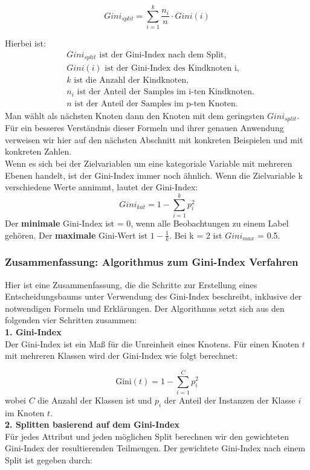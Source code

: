 \documentclass[12pt]{article}
\begin{document}
\[
Gini_{split} = \sum_{i=1}^{k} \frac{n_i}{n} \cdot Gini(i)
\]

Hierbei ist:
\begin{align*}
& Gini_{split} \text{{ ist der Gini-Index nach dem Split}}, \\
& Gini(i) \text{{ ist der Gini-Index des Kindknoten i}}, \\
& k \text{{ ist die Anzahl der Kindknoten}}, \\
& n_i \text{{ ist der Anteil der Samples im i-ten Kindknoten.}}\\
& n \text{{ ist der Anteil der Samples im p-ten Knoten.}}
\end{align*}
%
Man wählt als nächsten Knoten dann den Knoten mit dem geringsten $Gini_{split}$.
Für ein besseres Verständnis dieser Formeln und ihrer genauen Anwendung verweisen wir hier auf den nächsten Abschnitt mit konkreten Beispielen und mit konkreten Zahlen.\\
Wenn es sich bei der Zielvariablen um eine kategoriale Variable mit mehreren Ebenen handelt, ist der Gini-Index immer noch ähnlich. Wenn die Zielvariable k verschiedene Werte annimmt, lautet der Gini-Index:
\[
Gini_{kat} = 1 - \sum_{i=1}^{k} p_i^2
\]
%
Der \textbf{minimale} Gini-Index ist = 0, wenn alle Beobachtungen zu einem Label gehören. Der \textbf{maximale} Gini-Wert ist $1 - \frac{1}{k}$. Bei k = 2 ist $Gini_{max}$ = 0.5.\\
%
\subsubsection{Zusammenfassung: Algorithmus zum Gini-Index Verfahren}
%
Hier ist eine Zusammenfassung, die die Schritte zur Erstellung eines Entscheidungsbaums unter Verwendung des Gini-Index beschreibt, inklusive der notwendigen Formeln und Erklärungen. Der Algorithmus setzt sich aus den folgenden vier Schritten zusammen:\\
\textbf{1. Gini-Index}\\
%
Der Gini-Index ist ein Maß für die Unreinheit eines Knotens. Für einen Knoten \( t \) mit mehreren Klassen wird der Gini-Index wie folgt berechnet:

\[
\text{Gini}(t) = 1 - \sum_{i=1}^{C} p_i^2
\]
%
wobei \( C \) die Anzahl der Klassen ist und \( p_i \) der Anteil der Instanzen der Klasse \( i \) im Knoten \( t \).\\
%
\textbf{2. Splitten basierend auf dem Gini-Index}\\
%
Für jedes Attribut und jeden möglichen Split berechnen wir den gewichteten Gini-Index der resultierenden Teilmengen. Der gewichtete Gini-Index nach einem Split ist gegeben durch:
\end{document}
